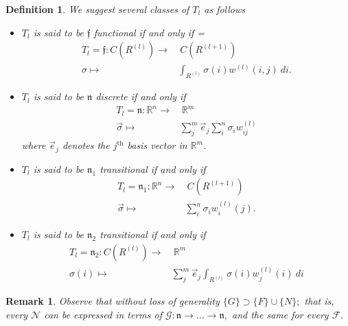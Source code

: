 \documentclass{article}
\newtheorem{remark}[theorem]{Remark}
\newtheorem{definition}[theorem]{Definition}
\begin{document}
\begin{definition}
We suggest several classes of $T_l$ as follows
  \begin{itemize}
  \item $T_l$ is said to be $\mathfrak{f}$ functional if and only if 
   =  \begin{equation} \label{eq:tlfunctional}
    \begin{aligned} 
      T_l = \mathfrak{f}: C(R^{(l)}) \to&\ C(R^{(l+1)}) \\
      \sigma \mapsto& \int_{R^{(l)}} \sigma(i) w^{(l)}(i,j)\ di.
    \end{aligned}
    \end{equation}
  \item $T_l$ is said to be $\mathfrak{n}$ discrete if and only if 
    \begin{equation} \label{eq:tldiscrete}
    \begin{aligned} 
      T_l = \mathfrak{n}: \mathbb{R}^n \to&\ \mathbb{R}^m \\
      \vec{\sigma} \mapsto& \sum_j^m \vec{e}_j\sum_i^n \sigma_i w^{(l)}_{ij}
    \end{aligned}
    \end{equation}
    where $\vec{e}_j$ denotes the $j^\mathrm{th}$ basis vector in $\mathbb{R}^m$.
  \item $T_l$ is said to be $\mathfrak{n}_1$ transitional if and only if 
    \begin{equation} \label{eq:tldiscrete}
    \begin{aligned} 
      T_l = \mathfrak{n}_1: \mathbb{R}^n \to&\  C(R^{(l+1)}) \\
      \vec{\sigma} \mapsto& \sum_i^n \sigma_i w^{(l)}_i(j).
    \end{aligned}
    \end{equation}
  \item $T_l$ is said to be $\mathfrak{n}_2$ transitional if and only if 
    \begin{equation} \label{eq:tldiscrete}
    \begin{aligned} 
      T_l = \mathfrak{n}_2: C(R^{(l)}) \to&\ \mathbb{R}^m \\
      \sigma(i) \mapsto& \sum_j^m \vec{e}_j\int_{R^{(l)}} \sigma(i) w^{(l)}_j(i)\ di
    \end{aligned}
    \end{equation}
  \end{itemize}
\end{definition}
\begin{remark}
  Observe that without loss of generality $\{G\} \supset \{F\} \cup \{N\};$ that is,
  every $\mathcal{N}$ can be expressed in terms of $\mathcal{G}: \mathfrak{n} \to \dots \to \mathfrak{n},$ and the same for every $\mathcal{F}. $ 
\end{remark}
\end{document}
